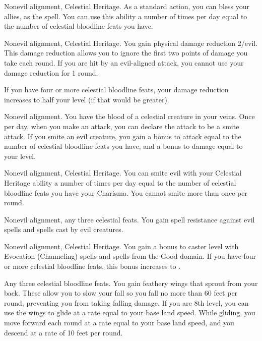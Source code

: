  Nonevil alignment, Celestial Heritage.
 As a standard action, you can bless your allies, as the  spell. You can use this ability a number of times per day equal to the number of celestial bloodline feats you have.

 Nonevil alignment, Celestial Heritage.
 You gain physical damage reduction 2/evil. This damage reduction allows you to ignore the first two points of damage you take each round. If you are hit by an evil-aligned attack, you cannot use your damage reduction for 1 round.

If you have four or more celestial bloodline feats, your damage reduction increases to half your level (if that would be greater).

 Nonevil alignment.
 You have the blood of a celestial creature in your veins. Once per day, when you make an attack, you can declare the attack to be a smite attack. If you smite an evil creature, you gain a bonus to attack equal to the number of celestial bloodline feats you have, and a bonus to damage equal to your level.

 Nonevil alignment, Celestial Heritage.
 You can smite evil with your Celestial Heritage ability a number of times per day equal to the number of celestial bloodline feats you have \add your Charisma. You cannot smite more than once per round.

 Nonevil alignment, any three celestial feats.
 You gain spell resistance against evil spells and spells cast by evil creatures.

 Nonevil alignment, Celestial Heritage.
 You gain a  bonus to caster level with Evocation (Channeling) spells and spells from the Good domain. If you have four or more celestial bloodline feats, this bonus increases to .

 Any three celestial bloodline feats.
 You gain feathery wings that sprout from your back. These allow you to slow your fall so you fall no more than 60 feet per round, preventing you from taking falling damage. If you are 8th level, you can use the wings to glide at a rate equal to your base land speed. While gliding, you move forward each round at a rate equal to your base land speed, and you descend at a rate of 10 feet per round.

